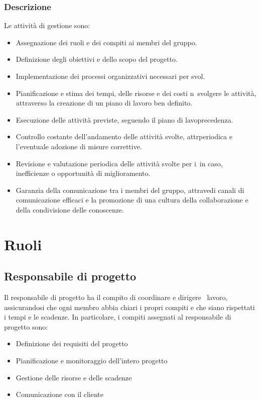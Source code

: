 \subsubsection{Descrizione}

Le attività di gestione sono:

\begin{itemize}
\item Assegnazione dei ruoli e dei compiti ai membri del gruppo.
\item Definizione degli obiettivi e dello scopo del progetto.
\item Implementazione dei processi organizzativi necessari per svol.
\item Pianificazione e stima dei tempi, delle risorse e dei costi n\ svolgere le attività, attraverso la creazione di un piano di lavoro ben definito.
\item Esecuzione delle attività previste, seguendo il piano di lavo\in precedenza.
\item Controllo costante dell'andamento delle attività svolte, attr\lutazione periodica e l'eventuale adozione di misure correttive.
\item Revisione e valutazione periodica delle attività svolte per i\ in caso, inefficienze o opportunità di miglioramento.
\item Garanzia della comunicazione tra i membri del gruppo, attrave\izione di canali di comunicazione efficaci e la promozione di una cultura della collaborazione e della condivisione delle conoscenze.
\end{itemize}

\section{Ruoli}

\subsection{Responsabile di progetto}
Il responsabile di progetto ha il compito di coordinare e dirigere \ lavoro, assicurandosi che ogni membro abbia chiari i propri compiti e che siano rispettati i tempi e le scadenze. In particolare, i compiti assegnati al responsabile di progetto sono:

\begin{itemize}
\item Definizione dei requisiti del progetto
\item Pianificazione e monitoraggio dell'intero progetto
\item Gestione delle risorse e delle scadenze
\item Comunicazione con il cliente
\end{itemize}

